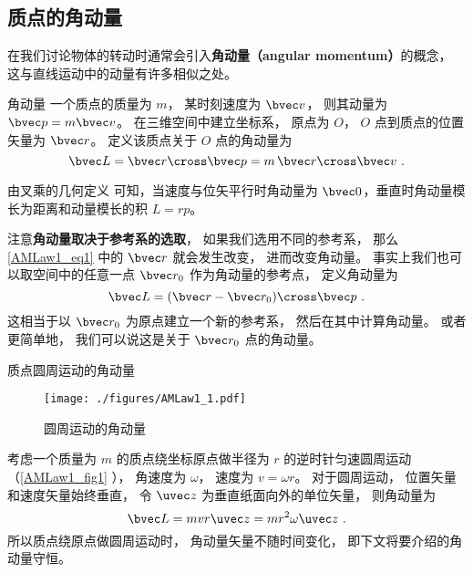 

\subsection{质点的角动量}
在我们讨论物体的转动时通常会引入\textbf{角动量（angular momentum）}的概念， 这与直线运动中的动量有许多相似之处。

\begin{definition}{角动量}
一个质点的质量为 $m$， 某时刻速度为 $\bvec v$， 则其动量为 $\bvec p = m\bvec v$。 在三维空间中建立坐标系， 原点为 $O$， $O$ 点到质点的位置矢量为 $\bvec r$。 定义该质点关于 $O$ 点的角动量为
\begin{equation}\label{AMLaw1_eq1}
\bvec L = \bvec r \cross \bvec p = m \,\bvec r\cross \bvec v~.
\end{equation}
\end{definition}

由叉乘的几何定义 可知，当速度与位矢平行时角动量为 $\bvec 0$，垂直时角动量模长为距离和动量模长的积 $L = rp$。

注意\textbf{角动量取决于参考系的选取}， 如果我们选用不同的参考系， 那么\autoref{AMLaw1_eq1} 中的 $\bvec r$ 就会发生改变， 进而改变角动量。 事实上我们也可以取空间中的任意一点 $\bvec r_0$ 作为角动量的参考点， 定义角动量为
\begin{equation}
\bvec L = (\bvec r - \bvec r_0) \cross \bvec p~.
\end{equation}
这相当于以 $\bvec r_0$ 为原点建立一个新的参考系， 然后在其中计算角动量。 或者更简单地， 我们可以说这是关于 $\bvec r_0$ 点的角动量。

\begin{example}{质点圆周运动的角动量}\label{AMLaw1_ex2}
\begin{figure}[ht]
\centering
\texttt{[image: ./figures/AMLaw1\_1.pdf]}
\caption{圆周运动的角动量} \label{AMLaw1_fig1}
\end{figure}
考虑一个质量为 $m$ 的质点绕坐标原点做半径为 $r$ 的逆时针匀速圆周运动（\autoref{AMLaw1_fig1} ）， 角速度为 $\omega$， 速度为 $v = \omega r$。 对于圆周运动， 位置矢量和速度矢量始终垂直， 令 $\uvec z$ 为垂直纸面向外的单位矢量， 则角动量为
\begin{equation}
\bvec L = mvr \uvec z = m r^2 \omega \uvec z~.
\end{equation}
所以质点绕原点做圆周运动时， 角动量矢量不随时间变化， 即下文将要介绍的角动量守恒。
\end{example}


